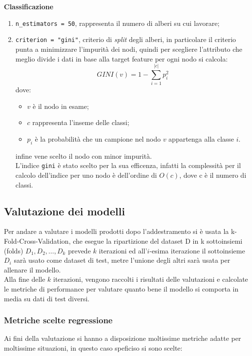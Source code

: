 \documentclass[italian,12pt,a4paper]{article}
\begin{document}
			\textbf{Classificazione}
			
				\begin{enumerate}
					
					\item \texttt{n\_estimators = 50}, rappresenta il numero di alberi su cui lavorare;
					\item  \texttt{criterion = "gini"}, criterio di \textit{split} degli alberi, in particolare il criterio punta a minimizzare l'impurità dei nodi, quindi per scegliere l'attributo che meglio divide i dati in base alla target feature per ogni nodo si calcola:
					$$GINI(v) = 1-\sum_{i = 1}^{|c|}p_i^2$$
					dove:
					\begin{itemize}
						\item $v$ è il nodo in esame;
						\item $c$ rappresenta l'inseme delle classi;
						\item $p_i$ è la probabilità che un campione nel nodo $v$ appartenga alla classe $i$.
					\end{itemize}
					infine vene scelto il nodo con minor impurità. \\
					\linebreak
					L'indice \texttt{gini} è stato scelto per la sua efficenza, infatti la complessità per il calcolo dell'indice per uno nodo è dell'ordine di $O(c)$, dove c è il numero di classi.
					
				\end{enumerate}
				
		\subsection{Valutazione dei modelli}
			Per andare a valutare i modelli prodotti dopo l'addestramento si è usata la k-Fold-Cross-Validation, che esegue la ripartizione del dataset D in k sottoinsiemi (folds) $D_1, D_2, \dots , D_k$ prevede $k$ iterazioni ed all'$i$-esima iterazione il sottoinsieme $D_i$ sarà usato come dataset di test, metre l'unione degli altri sarà usata per allenare il modello. \\
			\linebreak
			Alla fine delle $k$ iterazioni, vengono raccolti i risultati delle valutazioni e calcolate le metriche di performance per valutare quanto bene il modello si comporta in media su dati di test diversi.
			
			\subsubsection{Metriche scelte regressione}
				Ai fini della valutazione si hanno a disposizione moltissime metriche adatte per moltissime situazioni, in questo caso speficiso si sono scelte:
	
\end{document}
